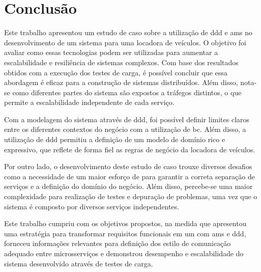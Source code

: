 \chapter{Conclusão}
\label{cap:conclusão}

Este trabalho apresentou um estudo de caso sobre a utilização de \acrfull{ddd} e \acrfull{ams} no desenvolvimento de um sistema para uma locadora de veículos. O objetivo foi avaliar como essas tecnologias podem ser utilizadas para aumentar a escalabilidade e resiliência de sistemas complexos. Com base dos resultados obtidos com a execução dos testes de carga, é possível concluir que essa abordagem é eficaz para a construção de sistemas distribuídos. Além disso, nota-se como diferentes partes do sistema são expostos a tráfegos distintos, o que permite a escalabilidade independente de cada serviço.

Com a modelagem do sistema através de \acrshort{ddd}, foi possível definir limites claros entre os diferentes contextos do negócio com a utilização de \acrfull{bc}. Além disso, a utilização de \acrshort{ddd} permitiu a definição de um modelo de domínio rico e expressivo, que reflete de forma fiel as regras de negócio da locadora de veículos.

Por outro lado, o desenvolvimento deste estudo de caso trouxe diversos desafios como a necessidade de um maior esforço de  para garantir a correta separação de serviços e a definição do domínio do negócio. Além disso, percebe-se uma maior complexidade para realização de testes e depuração de problemas, uma vez que o sistema é composto por diversos serviços independentes.

Este trabalho cumpriu com os objetivos propostos, na medida que apresentou uma estratégia para transformar requisitos funcionais em um  com \acrshort{ams} e \acrshort{ddd}, forneceu informações relevantes para definição dos estilo de comunicação adequado entre microsserviços e demonstrou desempenho e escalabilidade do sistema desenvolvido através de testes de carga.
